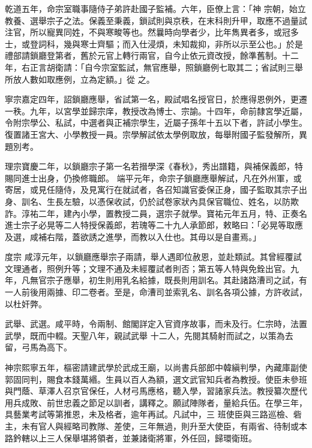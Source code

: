 \begin{pinyinscope}
 乾道五年，命宗室職事隨侍子弟許赴國子監補。六年，臣僚上言：「神
 宗朝，始立教養、選舉宗子之法。保義至秉義，鎖試則與京秩，在末科則升甲，取應不過量試注官，所以寵異同姓，不與寒畯等也。然曩時向學者少，比年雋異者多，或冠多士，或登詞科，幾與寒士齊驅；而入仕浸煩，未知裁抑，非所以示至公也。」於是禮部請鎖廳登第者，舊於元官上轉行兩官，自今止依元資改授，餘準舊制。十二年，右正言胡衛請：「自今宗室監試，無官應舉，照鎖廳例七取其二；省試則三舉所放人數如取應例，立為定額。」從
 之。



 寧宗嘉定四年，詔鎖廳應舉，省試第一名，殿試唱名授官日，於應得恩例外，更遷一秩。九年，以宮學並歸宗庠，教授改為博士、宗諭。十四年，命前隸宮學近屬，令附宗學公、私試，中選者與正補宗學生，近屬子孫年十五以下者，許試小學生。復置諸王宮大、小學教授一員。宗學解試依太學例取放，每舉附國子監發解所，異題別考。



 理宗寶慶二年，以鎖廳宗子第一名若搢學深《春秋》，秀出譜籍，與補保義郎，特賜同進士出身，仍換修職郎。
 端平元年，命宗子鎖廳應舉解試，凡在外州軍，或寄居，或見任隨侍，及見寓行在就試者，各召知識官委保正身，國子監取其宗子出身、訓名、生長左驗，以憑保收試，仍於試卷家狀內具保官職位、姓名，以防欺詐。淳祐二年，建內小學，置教授二員，選宗子就學。寶祐元年五月，特、正奏名進士宗子必晃等二人特授保義郎，若瑰等二十九人承節郎，敕略曰：「必晃等取應及選，咸補右階，蓋欲誘之進學，而教以入仕也。其毋以是自畫焉。」



 度宗
 咸淳元年，以鎖廳應舉宗子兩請，舉人遇即位赦恩，並赴類試。其曾經覆試文理通者，照例升等；文理不通及未經覆試者則否；第五等人特與免銓出官。九年，凡無官宗子應舉，初生則用乳名給據，既長則用訓名。其赴諸路漕司之試，有一人前後用兩據、印二卷者。至是，命漕司並索乳名、訓名各項公據，方許收試，以杜奸弊。



 武舉、武選。咸平時，令兩制、館閣詳定入官資序故事，而未及行。仁宗時，法置武學，既而中輟。天聖八年，親試武舉
 十二人，先閱其騎射而試之，以策為去留，弓馬為高下。



 神宗熙寧五年，樞密請建武學於武成王廟，以尚書兵部郎中韓縝判學，內藏庫副使郭固同判，賜食本錢萬緡。生員以百人為額，選文武官知兵者為教授。使臣未參班與門蔭、草澤人召京官保任，人材弓馬應格，聽入學，習諸家兵法。教授纂次歷代用兵成敗、前世忠義之節足以訓者，講釋之。願試陣隊者，量給兵伍。在學三年，具藝業考試等第推恩，未及格者，逾年再試。凡試中，三
 班使臣與三路巡檢、砦主，未有官人與經略司教隊、差使，三年無過，則升至大使臣，有兩省、待制或本路鈐轄以上三人保舉堪將領者，並兼諸衛將軍，外任回，歸環衛班。




\end{pinyinscope}
